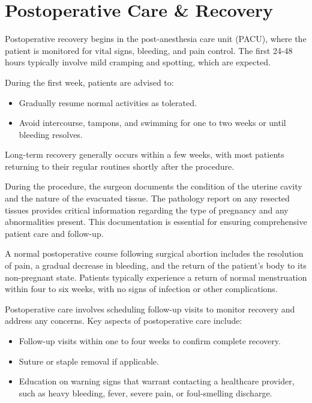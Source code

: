 \section*{Postoperative Care \& Recovery}
Postoperative recovery begins in the post-anesthesia care unit (PACU), where the patient is monitored for vital signs, bleeding, and pain control. The first 24-48 hours typically involve mild cramping and spotting, which are expected. 

During the first week, patients are advised to:

\begin{itemize}
  \item Gradually resume normal activities as tolerated.
  \item Avoid intercourse, tampons, and swimming for one to two weeks or until bleeding resolves.
\end{itemize}

Long-term recovery generally occurs within a few weeks, with most patients returning to their regular routines shortly after the procedure.

During the procedure, the surgeon documents the condition of the uterine cavity and the nature of the evacuated tissue. The pathology report on any resected tissues provides critical information regarding the type of pregnancy and any abnormalities present. This documentation is essential for ensuring comprehensive patient care and follow-up.

A normal postoperative course following surgical abortion includes the resolution of pain, a gradual decrease in bleeding, and the return of the patient's body to its non-pregnant state. Patients typically experience a return of normal menstruation within four to six weeks, with no signs of infection or other complications.

Postoperative care involves scheduling follow-up visits to monitor recovery and address any concerns. Key aspects of postoperative care include:

\begin{itemize}
  \item Follow-up visits within one to four weeks to confirm complete recovery.
  \item Suture or staple removal if applicable.
  \item Education on warning signs that warrant contacting a healthcare provider, such as heavy bleeding, fever, severe pain, or foul-smelling discharge.
\end{itemize}

